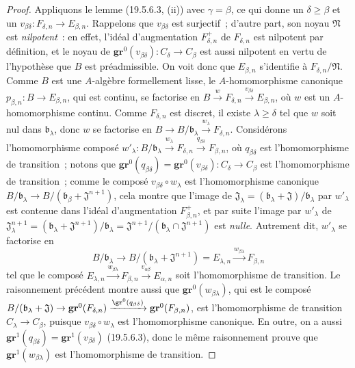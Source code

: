 \begin{proof}
Appliquons le lemme (19.5.6.3, (ii)) avec $\gamma=\beta$, ce qui donne un
$\delta\geq\beta$ et un
$v_{\beta\delta}:F_{\delta,n}\to E_{\beta,n}$. Rappelons que
$v_{\beta\delta}$ est surjectif~; d'autre part, son noyau $\mathfrak N$ est
\emph{nilpotent}~: en effet, l'idéal d'augmentation $F_{\delta,n}^+$ de
$F_{\delta,n}$ est nilpotent par définition, et le noyau de
$\mathbf{gr}^0(v_{\beta\delta}):C_\delta\to C_\beta$ est aussi nilpotent en vertu de
l'hypothèse que $B$ est préadmissible. On voit donc que $E_{\beta,n}$
s'identifie à $F_{\delta,n}/\mathfrak N$. Comme $B$ est une $A$-algèbre
formellement lisse, le $A$-homomorphisme canonique
$p_{\beta,n}:B\to E_{\beta,n}$, qui est continu, se factorise en
$B\xrightarrow{w}F_{\delta,n}\xrightarrow{v_{\beta\delta}}E_{\beta,n}$, où
$w$ est un $A$-homomorphisme continu. Comme $F_{\delta,n}$ est discret, il
existe $\lambda\geq\delta$ tel que $w$ soit nul dans $\mathfrak b_\lambda$,
donc $w$ se factorise en
$B\to B/\mathfrak b_\lambda\xrightarrow{w_\lambda}F_{\delta,n}$. Considérons
l'homomorphisme composé
$w'_\lambda:B/\mathfrak b_\lambda\xrightarrow{w_\lambda}F_{\delta,n}
\xrightarrow{q_{\beta\delta}}F_{\beta,n}$, où $q_{\beta\delta}$ est
l'homomorphisme de transition~; notons que
$\mathbf{gr}^0(q_{\beta\delta})=\mathbf{gr}^0(v_{\beta\delta}):C_\delta\to C_\beta$ est
l'homomorphisme de transition~; comme le composé
$v_{\beta\delta}\circ w_\lambda$ est l'homomorphisme
canonique $B/\mathfrak b_\lambda\to
B/(\mathfrak b_\beta+\mathfrak J^{n+1})$, cela montre que l'image de
$\mathfrak J_\lambda=(\mathfrak b_\lambda+\mathfrak J)/\mathfrak b_\lambda$
par $w'_\lambda$ est contenue dans l'idéal d'augmentation
$F_{\beta,n}^+$, et par suite l'image par $w'_\lambda$ de
$\mathfrak J_\lambda^{n+1}=(\mathfrak b_\lambda+\mathfrak J^{n+1})/
\mathfrak b_\lambda=\mathfrak J^{n+1}/(\mathfrak b_\lambda\cap\mathfrak J^{n+1})$ est \emph{nulle}. Autrement dit,
$w'_\lambda$ se factorise en
\[
  B/\mathfrak b_\lambda\to
  B/(\mathfrak b_\lambda+\mathfrak J^{n+1})=E_{\lambda,n}
  \xrightarrow{w_{\beta\lambda}}F_{\beta,n}
\]
tel que le composé
$E_{\lambda,n}\xrightarrow{w_{\beta\lambda}}F_{\beta,n}
\xrightarrow{v_{\alpha\beta}}E_{\alpha,n}$ soit l'homomorphisme de transition.
Le raisonnement précédent montre aussi que $\mathbf{gr}^0(w_{\beta\lambda})$, qui est
le composé
$B/(\mathfrak b_\lambda+\mathfrak J)\to\mathbf{gr}^0(F_{\delta,n})
\xrightarrow{\gr^0(q_{\beta\delta})}\mathbf{gr}^0(F_{\beta,n})$, est l'homomorphisme
de transition $C_\lambda\to C_\beta$, puisque
$v_{\beta\delta}\circ w_\lambda$ est l'homomorphisme canonique. En outre, on a aussi
$\mathbf{gr}^1(q_{\beta\delta})=\mathbf{gr}^1(v_{\beta\delta})$ (19.5.6.3), donc le même
raisonnement prouve que $\mathbf{gr}^1(w_{\beta\lambda})$ est l'homomorphisme de
transition.
\end{proof}

